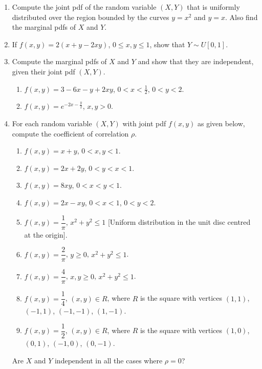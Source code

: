 \documentclass[svgnames]{amsart}
\begin{document}
\begin{enumerate}[leftmargin=*, itemsep=0.3em]
\item Compute the joint pdf of the random variable $(X, Y)$ that is uniformly distributed over the region bounded by the curves $y = x^2$ and $y = x$. Also find the marginal pdfs of $X$ and $Y$.

\item If $f(x, y) = 2(x + y - 2xy)$, $0 \le x, y \le 1$, show that $Y \sim U[0, 1]$.

\item Compute the marginal pdfs of $X$ and $Y$ and show that they are independent, given their joint pdf $(X, Y)$.
\begin{enumerate}
	\item $f(x, y) = 3 - 6x - y + 2xy$, $0 < x < \frac 1 2$, $0 < y < 2$.
	\item $f(x, y) = e^{-2x - \frac y 2}$, $x, y > 0$.
\end{enumerate}

\item For each random variable $(X, Y)$ with joint pdf $f(x, y)$ as given below, compute the coefficient of correlation $\rho$.
\begin{enumerate}
	\item $f(x, y) = x + y$, $0 < x, y < 1$.
	\item $f(x, y) = 2x + 2y$, $0 < y < x < 1$.
    \item $f(x, y) = 8xy$, $0 < x < y < 1$.
	\item $f(x, y) = 2x - xy$, $0 < x < 1$, $0 < y < 2$.
	\item $f(x, y) = \dfrac 1 \pi$, $x^2 + y^2 \le 1$ [Uniform distribution in the unit disc centred at the origin].
	\item $f(x, y) = \dfrac 2 \pi$, $y \ge 0$, $x^2 + y^2 \le 1$.
	\item $f(x, y) = \dfrac 4 \pi$, $x,y \ge 0$, $x^2 + y^2 \le 1$.
	\item $f(x, y) = \dfrac 1 4$, $(x, y) \in R$, where $R$ is the square with vertices $(1, 1)$, $(-1, 1)$, $(-1, -1)$, $(1, -1)$.
	\item $f(x, y) = \dfrac 1 2$, $(x, y) \in R$, where $R$ is the square with vertices $(1, 0)$, $(0, 1)$, $(-1, 0)$, $(0, -1)$.
\end{enumerate}
Are $X$ and $Y$ independent in all the cases where $\rho = 0$?
\end{enumerate}
\end{document}

